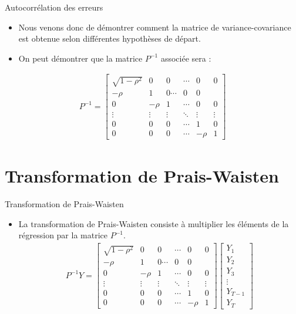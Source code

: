 \documentclass{beamer}
\begin{document}
\begin{frame}{Autocorrélation des erreurs}
\begin{itemize}
\item Nous venons donc de démontrer comment la matrice de variance-covariance est obtenue selon différentes hypothèses de départ. 
\item On peut démontrer que la matrice $P^{-1}$ associée sera :
\end{itemize}
\begin{align*}
P^{-1}=\begin{bmatrix}
\sqrt{1-\rho^2} & 0 & 0 & \cdots & 0 & 0 \\
-\rho & 1 & 0 \cdots & 0 & 0 \\
0 & -\rho & 1 & \cdots & 0 & 0 \\
\vdots & \vdots & \vdots & \ddots & \vdots & \vdots \\
0 & 0 & 0 & \cdots & 1 & 0 \\
0 & 0 & 0 & \cdots & -\rho & 1 
\end{bmatrix}
\end{align*}
\end{frame}

\section{Transformation de Prais-Waisten}

\frame{\tableofcontents[current]}


\begin{frame}{Transformation de Prais-Waisten}
\begin{itemize}
\item La transformation de Prais-Waisten consiste à multiplier  les éléments de la régression par la matrice $P^{-1}$.
\begin{align*}

P^{-1} Y = \begin{bmatrix}
\sqrt{1-\rho^2} & 0 & 0 & \cdots & 0 & 0 \\
-\rho & 1 & 0 \cdots & 0 & 0 \\
0 & -\rho & 1 & \cdots & 0 & 0 \\
\vdots & \vdots & \vdots & \ddots & \vdots & \vdots \\
0 & 0 & 0 & \cdots & 1 & 0 \\
0 & 0 & 0 & \cdots & -\rho & 1 
\end{bmatrix}  \begin{bmatrix}
Y_1 \\
Y_2 \\
Y_3 \\
\vdots \\
Y_{T-1}\\
Y_T
\end{bmatrix} 

\end{align*}
\end{itemize}
\end{frame}
\end{document}
